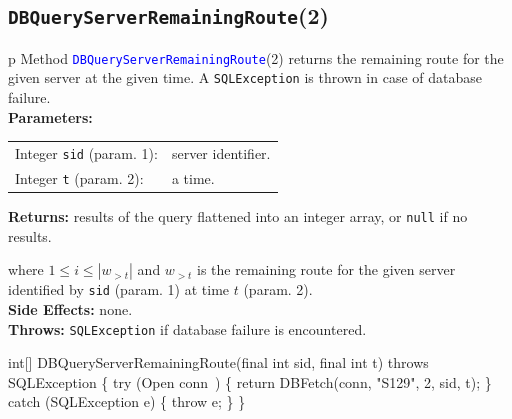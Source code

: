 \subsection{\texttt{DBQueryServerRemainingRoute}(2)}
\begin{tabular}{p{\textwidth}}
\toprule
{}
Method \textcolor{blue}{{\tt{}\protect{}DBQueryServerRemainingRoute}}(2) returns the
remaining route for the given server at the given time.
A {\tt{}SQLException} is thrown in case of database failure.\\
\midrule
\textbf{Parameters:} \\
\begin{tabular}{lp{116mm}}
Integer {\tt{}sid} (param. 1):&server identifier.\\
Integer {\tt{}t} (param. 2):&a time.\\
\end{tabular}
\textbf{Returns:} results of the query flattened into an integer array,
or {\tt{}null} if no results.


where $1\leq i\leq |w_{>t}|$ and $w_{>t}$ is the remaining route for the
given server identified by {\tt{}sid} (param. 1) at time $t$ (param. 2).\\
\textbf{Side Effects:} none.\\
\textbf{Throws:} {\tt{}SQLException} if database failure is encountered.\\
\bottomrule
\end{tabular}
\nwenddocs{}\endmoddef{}
int[] DBQueryServerRemainingRoute(final int sid, final int t) throws SQLException \{
  try (\LA{}Open \code{}conn\edoc{}~{\nwtagstyle{}}\RA{}) \{
    return DBFetch(conn, "S129", 2, sid, t);
  \} catch (SQLException e) \{
    throw e;
  \}
\}
\eatline
